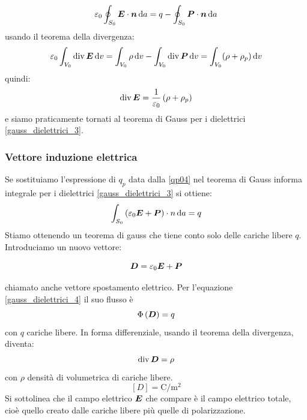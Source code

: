 \begin{equation}
  \varepsilon_0\oint_{S_0}\boldsymbol{E}\cdot\boldsymbol{n}\,\mathrm{d} a=q-\oint_{S_0}\boldsymbol{P}\cdot\boldsymbol{n}\,\mathrm{d} a
\end{equation}
usando il teorema della divergenza:
\begin{equation}
  \varepsilon_0\int_{V_0}\operatorname{div}\boldsymbol{E}\,\mathrm{d} v=\int_{V_0}\rho\,\mathrm{d} v-\int_{V_0}\operatorname{div}\boldsymbol{P}\,\mathrm{d} v=\int_{V_0}(\rho+\rho_p)\,\mathrm{d} v
\end{equation}
quindi:
\begin{equation}
  \operatorname{div}\boldsymbol{E}=\frac{1}{\varepsilon_0}\left(\rho+\rho_p\right)
\end{equation}
e siamo praticamente tornati al teorema di Gauss per i dielettrici \eqref{gauss_dielettrici_3}.
\subsubsection{Vettore induzione elettrica}
Se sostituiamo l'espressione di $q_p$ data dalla \eqref{qp04} nel teorema di Gauss informa integrale per i dielettrici \eqref{gauss_dielettrici_3} si ottiene:
\begin{equation}
  \int_{S_0}\left(\varepsilon_0\boldsymbol{E}+\boldsymbol{P}\right)\cdot n\,\mathrm{d} a= q
  \label{gauss_dielettrici_4}
\end{equation}
Stiamo ottenendo un teorema di gauss che tiene conto solo delle cariche libere $q$. Introduciamo un nuovo vettore:
\begin{Def}
  \begin{equation}
    \boldsymbol{D}=\varepsilon_0\boldsymbol{E}+\boldsymbol{P}
    \label{vettore_induzione_elettrica01}
  \end{equation}
\end{Def}
chiamato anche vettore spostamento elettrico. Per l'equazione \eqref{gauss_dielettrici_4} il suo flusso è
\begin{equation}
  \Phi\left(\boldsymbol{D}\right)=q
\end{equation}
con $q$ cariche libere. In forma differenziale, usando il teorema della divergenza, diventa:
\begin{equation}
  \operatorname{div}\boldsymbol{D}=\rho
\end{equation}
con $\rho$ densità di volumetrica di cariche libere.
\[
  [D]=\si{\coulomb\per\meter^2}
\]
Si sottolinea che il campo elettrico $\boldsymbol{E}$ che compare è il campo elettrico totale, cioè quello creato dalle cariche libere più quelle di polarizzazione.
